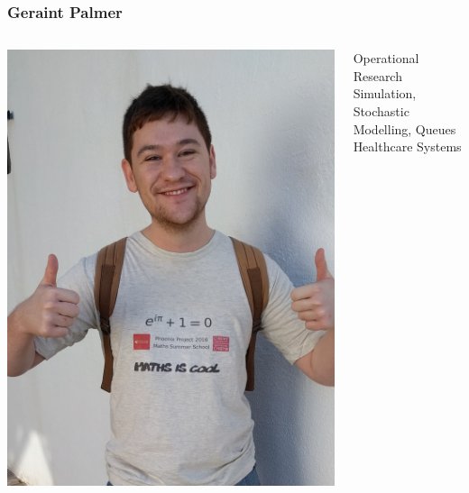 \documentclass{beamer}
\begin{document}
\begin{frame}
  \frametitle{Geraint Palmer}
  \begin{columns}
    \begin{column}{0.5\textwidth}
      \begin{center}
        \includegraphics[width=\textwidth]{GeraintPhoto}
      \end{center}
    \end{column}
    \begin{column}{0.5\textwidth}
      \begin{center}
        Operational Research\\
        \vspace{10mm}
        Simulation, Stochastic Modelling, Queues\\
        \vspace{10mm}
        Healthcare Systems\\
      \end{center}
    \end{column}
  \end{columns}
\end{frame}
\end{document}
